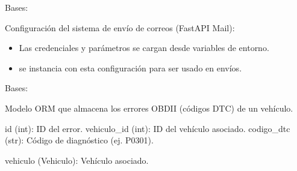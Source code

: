 \documentclass[letterpaper,10pt,spanish]{sphinxmanual}
\begin{document}
\begin{fulllineitems}
\label{\detokenize{modelos:main.Base}}
\pysigstartsignatures
\pysiglinewithargsret
{}
{}
{}
\pysigstopsignatures
\sphinxAtStartPar
Bases: 

\sphinxAtStartPar
Configuración del sistema de envío de correos (FastAPI Mail):
\begin{itemize}
\item {} 
\sphinxAtStartPar
Las credenciales y parámetros se cargan desde variables de entorno.

\item {} 
\sphinxAtStartPar
{} se instancia con esta configuración para ser usado en envíos.

\end{itemize}

\end{fulllineitems}


\begin{fulllineitems}
\label{\detokenize{modelos:main.ErrorVehiculo}}
\pysigstartsignatures
\pysiglinewithargsret
{}
{}
{}
\pysigstopsignatures
\sphinxAtStartPar
Bases: {\hyperref[\detokenize{modelos:main.Base}]{}}

\sphinxAtStartPar
Modelo ORM que almacena los errores OBD\sphinxhyphen{}II (códigos DTC) de un vehículo.
\begin{description}
\sphinxAtStartPar
id (int): ID del error.
vehiculo\_id (int): ID del vehículo asociado.
codigo\_dtc (str): Código de diagnóstico (ej. P0301).

\sphinxAtStartPar
vehiculo (Vehiculo): Vehículo asociado.

\end{description}

\end{fulllineitems}

\end{document}
